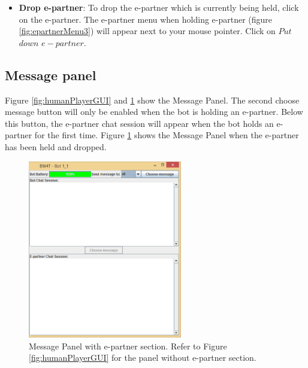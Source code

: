\begin{itemize}
\item \textbf{Drop e-partner}:
To drop the e-partner which is currently being held, click on the e-partner. The e-partner menu when holding e-partner (figure  \ref{fig:epartnerMenu3}) will appear next to your mouse pointer. Click on $Put$ $down$ $e-partner$.

\end{itemize}


\subsection{Message panel}
Figure \ref{fig:humanPlayerGUI} and \ref{fig:mp2} show the Message Panel. The second choose message button will only be enabled when the bot is holding an e-partner. Below this button, the e-partner chat session will appear when the bot holds an e-partner for the first time. Figure \ref{fig:mp2} shows the Message Panel when the e-partner has been held and dropped.

\begin{figure}[h]
\begin{center}
\includegraphics[width=0.6\textwidth]{HumanPlayerGUI/hpg-right-epartner.png}
\end{center}
\caption{Message Panel with e-partner section. Refer to Figure \ref{fig:humanPlayerGUI} for the panel without e-partner section. }
\label{fig:mp2}
\end{figure}

